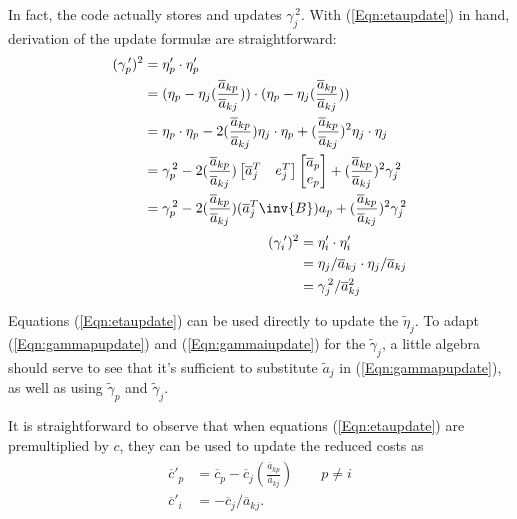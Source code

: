 In fact, the code actually stores and updates $\gamma_j^{\,2}$.
With (\ref{Eqn:etaupdate}) in hand, derivation of the update formul\ae{}
are straightforward:
\begin{align}
\begin{split}
(\gamma^{\,\prime}_p)^2 & = \eta'_p \cdot \eta'_p \\
  & = (\eta_p - \eta_j( \frac{\overline{a}_{kp}}{\overline{a}_{kj}} )) \cdot
      (\eta_p - \eta_j( \frac{\overline{a}_{kp}}{\overline{a}_{kj}} )) \\
  & = \eta_p \cdot \eta_p -
      2( \frac{\overline{a}_{kp}}{\overline{a}_{kj}} )\eta_j \cdot \eta_p +
      ( \frac{\overline{a}_{kp}}{\overline{a}_{kj}} )^2 \eta_j \cdot \eta_j \\
  & = \gamma_p^{\,2} -
      2( \frac{\overline{a}_{kp}}{\overline{a}_{kj}} )
      \begin{bmatrix} \overline{a}^T_j & e^T_j \end{bmatrix}
      \begin{bmatrix} \overline{a}_p \\ e_p \end{bmatrix} +
      ( \frac{\overline{a}_{kp}}{\overline{a}_{kj}} )^2 \gamma_j^{\,2} \\
  & = \gamma_p^{\,2} -
      2( \frac{\overline{a}_{kp}}{\overline{a}_{kj}} )
      (\overline{a}^T_j \inv{B}) a_p +
      ( \frac{\overline{a}_{kp}}{\overline{a}_{kj}} )^2 \gamma_j^{\,2}
      \label{Eqn:gammapupdate}
\end{split} \\[.5ex]
\begin{split}
(\gamma^{\,\prime}_i)^2 & = \eta'_i \cdot \eta'_i \\
  & = \eta_j/\overline{a}_{kj} \cdot \eta_j/\overline{a}_{kj} \\
  & = \gamma_j^{\,2}/\overline{a}^2_{kj}  \label{Eqn:gammaiupdate}
\end{split}
\end{align}

Equations (\ref{Eqn:etaupdate}) can be used directly to update the
$\tilde{\eta}_j$.
To adapt (\ref{Eqn:gammapupdate}) and (\ref{Eqn:gammaiupdate}) for the
$\tilde{\gamma}_j$,
a little algebra should serve to see that it's sufficient to substitute
$\tilde{a}_j$ in (\ref{Eqn:gammapupdate}), as well as using
$\tilde{\gamma}_p$ and $\tilde{\gamma}_j$.

It is straightforward to observe that when equations (\ref{Eqn:etaupdate})
are premultiplied by $c$, they can be used to update the reduced costs as
\begin{align*}
\begin{split}
\overline{c}'_p & = \overline{c}_p -
	\overline{c}_j( \frac{\overline{a}_{kp}}{\overline{a}_{kj}} )
\qquad p \neq i \\
\overline{c}'_i & = - \overline{c}_j/\overline{a}_{kj}.
\end{split}
\end{align*}

